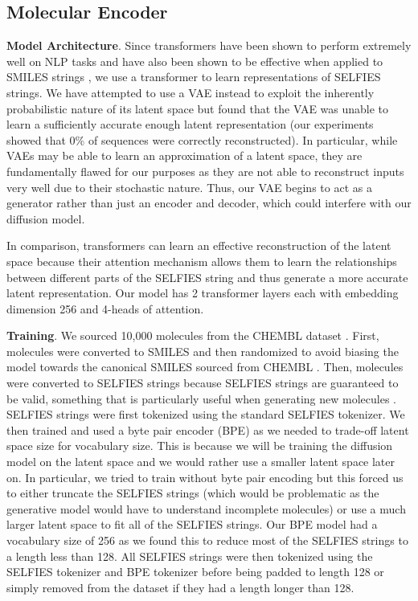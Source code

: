\documentclass[11pt]{article}
\begin{document}
\subsection{Molecular Encoder}
\textbf{Model Architecture}.
Since transformers \cite{vaswani2023attentionneed} have been shown to perform extremely 
well on NLP tasks \cite{brown2020languagemodelsfewshotlearners} and have also been shown to be effective 
when applied to SMILES strings \cite{honda2019smilestransformerpretrainedmolecular} \cite{fabian2020molecularrepresentationlearninglanguage}, we use a transformer to learn 
representations of SELFIES strings. We have attempted to use a VAE 
instead to exploit the inherently probabilistic nature of its latent space but found that the
VAE was unable to learn a sufficiently accurate enough latent 
representation (our experiments showed that 0\% of sequences were correctly reconstructed). In particular, 
while VAEs may be able to learn an approximation of a latent space, they are 
fundamentally flawed for our purposes as they are not able to reconstruct inputs very well due to their 
stochastic nature. Thus, our VAE begins to act as a generator rather than just an encoder and decoder, which could 
interfere with our diffusion model. 

In comparison, transformers can learn an effective reconstruction of the latent space 
because their attention mechanism allows them to learn the relationships between different parts 
of the SELFIES string and thus generate a more accurate latent representation. Our model has 2 transformer 
layers each with embedding dimension 256 and 4-heads of attention.

\textbf{Training}.
We sourced 10,000 molecules from the CHEMBL dataset \cite{zdrazil23}.
First, molecules were converted to SMILES and then randomized 
to avoid biasing the model towards the canonical SMILES sourced from 
CHEMBL \cite{Arus-Pous2019}. Then, molecules were converted to SELFIES strings 
because SELFIES strings are guaranteed to be valid, something 
that is particularly useful when generating new molecules \cite{Krenn19}. 
SELFIES strings were first tokenized using the standard SELFIES tokenizer. 
We then trained and used a byte pair encoder (BPE)
\cite{sennrich2016neuralmachinetranslationrare} as we needed to 
trade-off latent space size for vocabulary size. This is because we will be 
training the diffusion model on the latent space and we would rather use
a smaller latent space later on. In particular, we tried to train without
byte pair encoding but this forced us to either truncate the SELFIES strings 
(which would be problematic as the generative model would have to understand incomplete molecules)
or use a much larger latent space to fit all of the SELFIES strings. Our BPE model had a vocabulary size of 
256 as we found this to reduce most of the SELFIES strings to a 
length less than 128. All SELFIES strings were then tokenized using the 
SELFIES tokenizer and BPE tokenizer before being padded to length 128 or simply 
removed from the dataset if they had a length longer than 128. 
\end{document}
